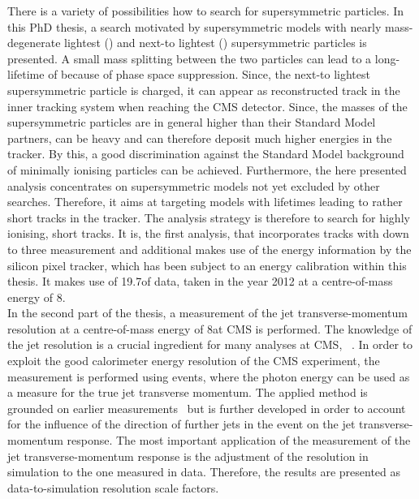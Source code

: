 There is a variety of possibilities how to search for supersymmetric particles.
In this PhD thesis, a search motivated by supersymmetric models with nearly mass-degenerate lightest (\chiO) and next-to lightest (\chipm) supersymmetric particles is presented.
A small mass splitting between the two particles can lead to a long-lifetime of \chipm because of phase space suppression.
Since, the next-to lightest supersymmetric particle is charged, it can appear as reconstructed track in the inner tracking system when reaching the CMS detector. 
Since, the masses of the supersymmetric particles are in general higher than their Standard Model partners, \chipm can be heavy and can therefore deposit much higher energies in the tracker.
By this, a good discrimination against the Standard Model background of minimally ionising particles can be achieved.
Furthermore, the here presented analysis concentrates on supersymmetric models not yet excluded by other searches. 
Therefore, it aims at targeting models with \chipm lifetimes leading to rather short tracks in the tracker. 
The analysis strategy is therefore to search for highly ionising, short tracks.
It is, the first analysis, that incorporates tracks with down to three measurement and additional makes use of the energy information by the silicon pixel tracker, which has been subject to an energy calibration within this thesis.
It makes use of 19.7\fbinv of data, taken in the year 2012 at a centre-of-mass energy of 8\tev.\\

In the second part of the thesis, a measurement of the jet transverse-momentum resolution at a centre-of-mass energy of 8\tev at CMS is performed.
The knowledge of the jet \pt resolution is a crucial ingredient for many analyses at CMS, \eg~\cite{bib:CMS:QCD_measurements,bib:CMS:TopCrossSection_8TeV,bib:CMS:RA2_8TeV}.
In order to exploit the good calorimeter energy resolution of the CMS experiment, the measurement is performed using \GAMJET events, where the photon energy can be used as a measure for the true jet transverse momentum.
The applied method is grounded on earlier measurements~\cite{bib:CMS:JERCPaper_2011,CMS:PAS:JETResolution_7TeV} but is further developed in order to account for the influence of the direction of further jets in the event on the jet transverse-momentum response.
The most important application of the measurement of the jet transverse-momentum response is the adjustment of the resolution in simulation to the one measured in data.
Therefore, the results are presented as data-to-simulation resolution scale factors.\\

